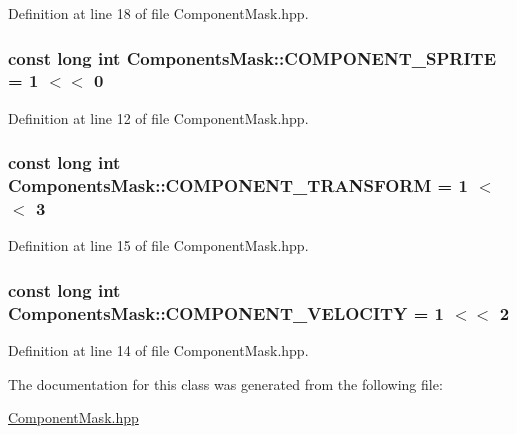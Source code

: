 Definition at line 18 of file Component\+Mask.\+hpp.

\hypertarget{class_components_mask_ab05302f9381801724a58273ff83ad2a6}{
\subsubsection[{C\+O\+M\+P\+O\+N\+E\+N\+T\+\_\+\+S\+P\+R\+I\+T\+E}]{\setlength{\rightskip}{0pt plus 5cm}const long int Components\+Mask\+::\+C\+O\+M\+P\+O\+N\+E\+N\+T\+\_\+\+S\+P\+R\+I\+T\+E = 1 $<$$<$ 0\hspace{0.3cm}{\ttfamily [static]}}}\label{class_components_mask_ab05302f9381801724a58273ff83ad2a6}


Definition at line 12 of file Component\+Mask.\+hpp.

\hypertarget{class_components_mask_a3a66579e45c351c13abe63e61f2eaa0a}{
\subsubsection[{C\+O\+M\+P\+O\+N\+E\+N\+T\+\_\+\+T\+R\+A\+N\+S\+F\+O\+R\+M}]{\setlength{\rightskip}{0pt plus 5cm}const long int Components\+Mask\+::\+C\+O\+M\+P\+O\+N\+E\+N\+T\+\_\+\+T\+R\+A\+N\+S\+F\+O\+R\+M = 1 $<$$<$ 3\hspace{0.3cm}{\ttfamily [static]}}}\label{class_components_mask_a3a66579e45c351c13abe63e61f2eaa0a}


Definition at line 15 of file Component\+Mask.\+hpp.

\hypertarget{class_components_mask_ac7fff00913ea1c8b225c90b02ecd3243}{
\subsubsection[{C\+O\+M\+P\+O\+N\+E\+N\+T\+\_\+\+V\+E\+L\+O\+C\+I\+T\+Y}]{\setlength{\rightskip}{0pt plus 5cm}const long int Components\+Mask\+::\+C\+O\+M\+P\+O\+N\+E\+N\+T\+\_\+\+V\+E\+L\+O\+C\+I\+T\+Y = 1 $<$$<$ 2\hspace{0.3cm}{\ttfamily [static]}}}\label{class_components_mask_ac7fff00913ea1c8b225c90b02ecd3243}


Definition at line 14 of file Component\+Mask.\+hpp.



The documentation for this class was generated from the following file\+:\begin{DoxyCompactItemize}
\item 
\hyperlink{_component_mask_8hpp}{Component\+Mask.\+hpp}\end{DoxyCompactItemize}
